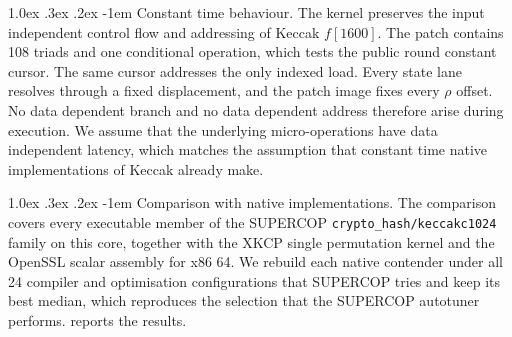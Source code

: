 \documentclass[journal=tches,submission]{iacrtrans}
\makeatletter
\renewcommand\paragraph{\@startsection{paragraph}{4}{\z@}%
      {1.0ex \@plus .3ex \@minus .2ex}%
      {-1em}%
      {\normalfont\normalsize\bfseries\SS@parafont}}
\makeatother
\begin{document}
\paragraph{Constant time behaviour.}
The kernel preserves the input independent control flow and addressing of Keccak $f[1600]$.
The patch contains 108 triads and one conditional operation, which tests the public round constant cursor.
The same cursor addresses the only indexed load.
Every state lane resolves through a fixed displacement, and the patch image fixes every $\rho$ offset.
No data dependent branch and no data dependent address therefore arise during execution.
We assume that the underlying micro-operations have data independent latency, which matches the assumption that constant time native implementations of Keccak already make.

\paragraph{Comparison with native implementations.}
The comparison covers every executable member of the SUPERCOP \texttt{crypto\_hash/\allowbreak keccakc1024} family on this core, together with the XKCP single permutation kernel and the OpenSSL scalar assembly for x86 64.
We rebuild each native contender under all 24 compiler and optimisation configurations that SUPERCOP tries and keep its best median, which reproduces the selection that the SUPERCOP autotuner performs.
 reports the results.
\end{document}
